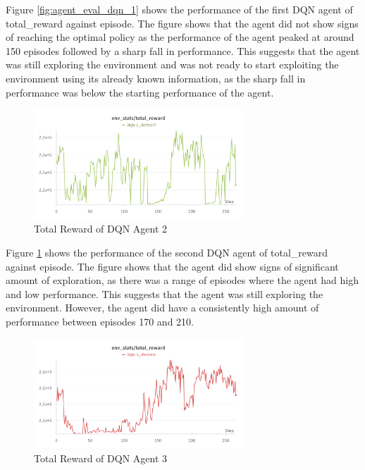 Figure \ref{fig:agent_eval_dqn_1} shows the performance of the first DQN agent of total\_reward against episode. The figure shows that the agent did not show signs of reaching the optimal policy as the performance of the agent peaked at around 150 episodes followed by a sharp fall in performance. This suggests that the agent was still exploring the environment and was not ready to start exploiting the environment using its already known information, as the sharp fall in performance was below the starting performance of the agent.

\begin{figure}[H]
    \centering
    \includegraphics[width=0.7\textwidth]{figures/DQN-2_TotalReward.png}
    \caption{Total Reward of DQN Agent 2}
    \label{fig:agent_eval_dqn_2}
\end{figure}

Figure \ref{fig:agent_eval_dqn_2} shows the performance of the second DQN agent of total\_reward against episode. The figure shows that the agent did show signs of significant amount of exploration, as there was a range of episodes where the agent had high and low performance. This suggests that the agent was still exploring the environment. However, the agent did have a consistently high amount of performance between episodes 170 and 210.

\begin{figure}[H]
    \centering
    \includegraphics[width=0.7\textwidth]{figures/DQN-3_TotalReward.png}
    \caption{Total Reward of DQN Agent 3}
    \label{fig:agent_eval_dqn_3}
\end{figure}

